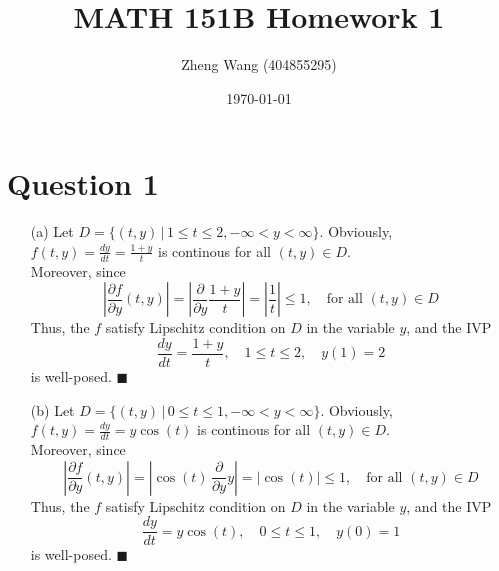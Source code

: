 \documentclass[11pt]{article}
\author{Zheng Wang (404855295)}
\date{\today}
\title{MATH 151B Homework 1}
\begin{document}
	

\maketitle
\section*{Question 1}
\begin{itemize}
	\item [(a)]
	Let $ D = \{(t,y) \, | \, 1\le t\le 2, -\infty <y<\infty\} $. Obviously, $ f(t,y) = \frac{dy}{dt} = \frac{1+y}{t} $ is continous for all $ (t,y) \in D $.\\
	Moreover, since
	\[ \left| \frac{\partial f}{\partial y} (t,y) \right| = \left| \frac{\partial}{\partial y} \frac{1+y}{t} \right| = \left| \frac{1}{t} \right| \le 1,\quad \text{for all } (t,y)\in D  \]
	Thus, the $ f $ satisfy Lipschitz condition on $ D $ in the variable $ y $, and the IVP 
	\[ \frac{dy}{dt} =\frac{1+y}{t}, \quad1\le t\le 2, \quad y(1)=2\]
	is well-posed. \hfill $ \blacksquare $
	
	\item [(b)]
	Let $ D = \{(t,y) \, | \, 0\le t\le 1, -\infty <y<\infty\} $. Obviously, $ f(t,y) = \frac{dy}{dt} = y\cos(t) $ is continous for all $ (t,y) \in D $.\\
	Moreover, since
	\[ \left| \frac{\partial f}{\partial y} (t,y) \right| = \left| \cos(t) \, \frac{\partial}{\partial y} y \right| = \left| \cos(t) \right| \le 1,\quad \text{for all } (t,y)\in D  \]
	Thus, the $ f $ satisfy Lipschitz condition on $ D $ in the variable $ y $, and the IVP 
	\[ \frac{dy}{dt} =y\cos(t), \quad0\le t\le 1, \quad y(0)=1\]
	is well-posed. \hfill $ \blacksquare $
\end{itemize}
\end{document}

